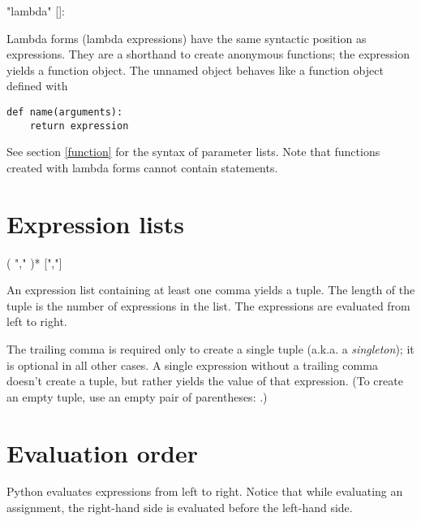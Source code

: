\begin{productionlist}
             {"lambda" []: }
\end{productionlist}

Lambda forms (lambda expressions) have the same syntactic position as
expressions.  They are a shorthand to create anonymous functions; the
expression 
yields a function object.  The unnamed object behaves like a function
object defined with

\begin{verbatim}
def name(arguments):
    return expression
\end{verbatim}

See section \ref{function} for the syntax of parameter lists.  Note
that functions created with lambda forms cannot contain statements.
\label{lambda}

\section{Expression lists\label{exprlists}}

\begin{productionlist}
             { ( ","  )* [","]}
\end{productionlist}

An expression list containing at least one comma yields a
tuple.  The length of the tuple is the number of expressions in the
list.  The expressions are evaluated from left to right.

The trailing comma is required only to create a single tuple (a.k.a. a
\emph{singleton}); it is optional in all other cases.  A single
expression without a trailing comma doesn't create a
tuple, but rather yields the value of that expression.
(To create an empty tuple, use an empty pair of parentheses:
\code{()}.)

\section{Evaluation order\label{evalorder}}

Python evaluates expressions from left to right. Notice that while
evaluating an assignment, the right-hand side is evaluated before
the left-hand side.

